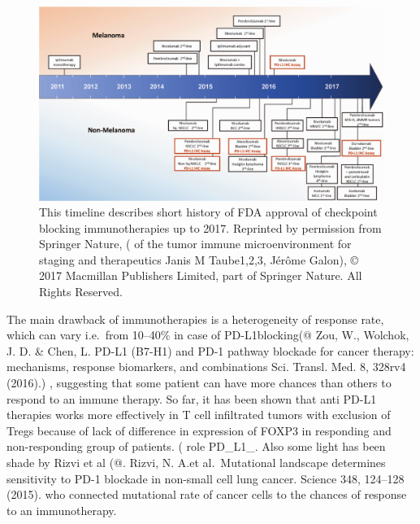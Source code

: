 \documentclass[12pt,]{book}
\theoremstyle{definition}
\theoremstyle{definition}
\theoremstyle{definition}
\theoremstyle{remark}
\begin{document}
\begin{figure}

{\centering \includegraphics[width=1\linewidth]{figures-ext/02-timeline-immunotherapies} 

}

\caption{This timeline describes short
history of FDA approval of checkpoint blocking immunotherapies up to
2017. Reprinted by permission from Springer Nature,
(\citet{Implications} of the tumor immune microenvironment for staging
and therapeutics Janis M Taube1,2,3, Jérôme Galon), © 2017 Macmillan
Publishers Limited, part of Springer Nature. All Rights Reserved.}\label{fig:timeline-immunotherapies}
\end{figure}








The main drawback of immunotherapies is a heterogeneity of response
rate, which can vary i.e.~from 10--40\% in case of PD-L1blocking(@ Zou,
W., Wolchok, J. D. \& Chen, L. PD-L1 (B7-H1) and PD-1 pathway blockade
for cancer therapy: mechanisms, response biomarkers, and combinations
Sci. Transl. Med. 8, 328rv4 (2016).) , suggesting that some patient can
have more chances than others to respond to an immune therapy. So far,
it has been shown that anti PD-L1 therapies works more effectively in T
cell infiltrated tumors with exclusion of Tregs because of lack of
difference in expression of FOXP3 in responding and non-responding group
of patients. (\citet{Herbst.predictive} role PD\_L1\_. Also some light
has been shade by Rizvi et al (@. Rizvi, N. A.et al.~Mutational
landscape determines sensitivity to PD-1 blockade in non-small cell lung
cancer. Science 348, 124--128 (2015). who connected mutational rate of
cancer cells to the chances of response to an immunotherapy.
\end{document}
